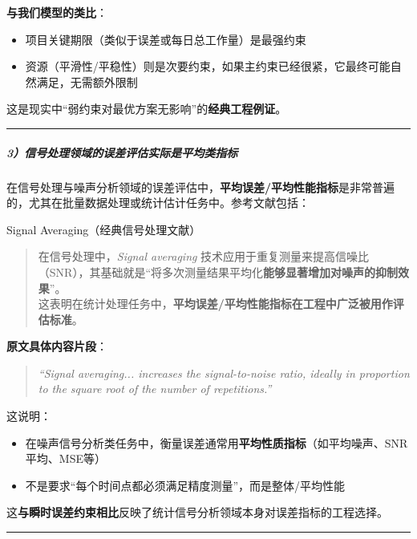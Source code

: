\documentclass[
]{article}
\begin{document}
\textbf{与我们模型的类比}：

\begin{itemize}
\item
  项目关键期限（类似于误差或每日总工作量）是最强约束
\item
  资源（平滑性/平稳性）则是次要约束，如果主约束已经很紧，它最终可能自然满足，无需额外限制
\end{itemize}

这是现实中``弱约束对最优方案无影响''的\textbf{经典工程例证}。

\begin{center}\rule{0.5\linewidth}{0.5pt}\end{center}

\subparagraph{3）信号处理领域的误差评估实际是平均类指标}\label{3uxff09ux4fe1ux53f7ux5904ux7406ux9886ux57dfux7684ux8befux5deeux8bc4ux4f30ux5b9eux9645ux662fux5e73ux5747ux7c7bux6307ux6807}

在信号处理与噪声分析领域的误差评估中，\textbf{平均误差/平均性能指标}是非常普遍的，尤其在批量数据处理或统计估计任务中。参考文献包括：

Signal Averaging（经典信号处理文献）

\begin{quote}
在信号处理中，\emph{Signal averaging}
技术应用于重复测量来提高信噪比（SNR），其基础就是``将多次测量结果平均化\textbf{能够显著增加对噪声的抑制效果}''。\\
这表明在统计处理任务中，\textbf{平均误差/平均性能指标在工程中广泛被用作评估标准}。
\end{quote}

\textbf{原文具体内容片段}：

\begin{quote}
\emph{``Signal averaging... increases the signal-to-noise ratio, ideally
in proportion to the square root of the number of repetitions.''}
\end{quote}

这说明：

\begin{itemize}
\item
  在噪声信号分析类任务中，衡量误差通常用\textbf{平均性质指标}（如平均噪声、SNR
  平均、MSE等）
\item
  不是要求``每个时间点都必须满足精度测量''，而是整体/平均性能
\end{itemize}

这\textbf{与瞬时误差约束相比}反映了统计信号分析领域本身对误差指标的工程选择。

\begin{center}\rule{0.5\linewidth}{0.5pt}\end{center}
\end{document}

